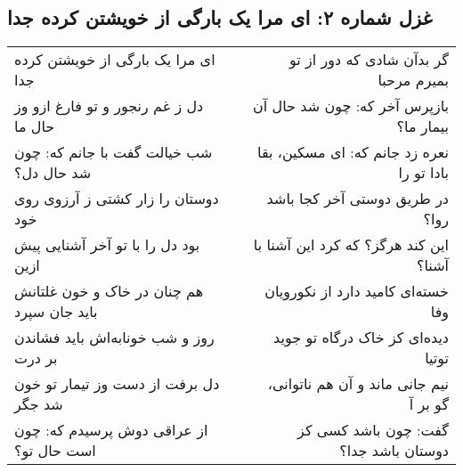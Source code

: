 \begin{center}
\section*{غزل شماره ۲: ای مرا یک بارگی از خویشتن کرده جدا}
\label{sec:002}
\begin{longtable}{l p{0.5cm} r}
ای مرا یک بارگی از خویشتن کرده جدا
&&
گر بدآن شادی که دور از تو بمیرم مرحبا
\\
دل ز غم رنجور و تو فارغ ازو وز حال ما
&&
بازپرس آخر که: چون شد حال آن بیمار ما؟
\\
شب خیالت گفت با جانم که: چون شد حال دل؟
&&
نعره زد جانم که: ای مسکین، بقا بادا تو را
\\
دوستان را زار کشتی ز آرزوی روی خود
&&
در طریق دوستی آخر کجا باشد روا؟
\\
بود دل را با تو آخر آشنایی پیش ازین
&&
این کند هرگز؟ که کرد این آشنا با آشنا؟
\\
هم چنان در خاک و خون غلتانش باید جان سپرد
&&
خسته‌ای کامید دارد از نکورویان وفا
\\
روز و شب خونابه‌اش باید فشاندن بر درت
&&
دیده‌ای کز خاک درگاه تو جوید توتیا
\\
دل برفت از دست وز تیمار تو خون شد جگر
&&
نیم جانی ماند و آن هم ناتوانی، گو بر آ
\\
از عراقی دوش پرسیدم که: چون است حال تو؟
&&
گفت: چون باشد کسی کز دوستان باشد جدا؟
\\
\end{longtable}
\end{center}
